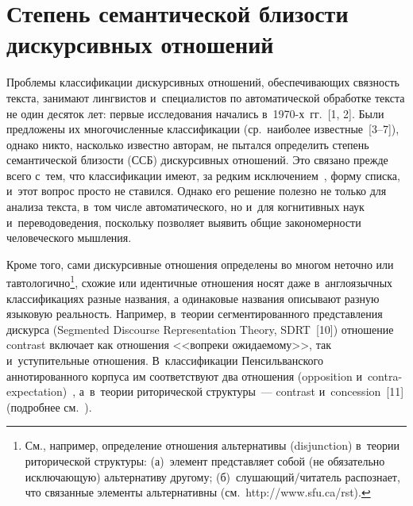 
  



\thispagestyle{headings}

\begin{multicols}{2}

\label{st\stat}
  
\section{Степень семантической близости дискурсивных 
отношений}


  Проблемы классификации дискурсивных отношений, обеспечивающих 
связность текста, занимают лингвистов и~специалистов по автоматической 
обработке текста не один десяток лет: первые исследования начались  
в~1970-х~гг.~[1, 2]. Были предложены их многочисленные классификации (ср.\ 
наиболее известные~[3--7]), однако никто, насколько известно авторам, не 
пытался определить степень семантической близости (ССБ) дискурсивных 
отношений. Это связано прежде всего с~тем, что классификации имеют, за 
редким исключением~\cite{7-in, 8-in, 9-in}, форму списка, и~этот вопрос просто 
не ставился. Однако его решение полезно не только для анализа текста, в~том 
числе автоматического, но и~для когнитивных наук и~переводоведения, 
поскольку позволяет выявить общие закономерности человеческого мышления.
  
  Кроме того, сами дискурсивные отношения определены во многом неточно 
или тавтологично\footnote[3]{См., например, определение отношения альтернативы 
(disjunction) в~теории риторической структуры: (а)~элемент пред\-став\-ля\-ет собой (не 
обязательно исключающую) альтернативу другому; (б)~слу\-ша\-ющий/чи\-та\-тель 
распознает, что связанные элементы альтернативны (см.\ {\sf http://www.sfu.ca/rst}).}, схожие 
или идентичные отношения носят даже в~англоязычных классификациях разные 
названия, а одинаковые названия описывают разную языковую реальность. 
Например, в~теории сегментированного представления дискурса (Segmented 
Discourse Representation Theory, SDRT~[10]) отношение contrast включает как 
отношения <<вопреки ожидаемому>>, так и~уступительные отношения. 
В~классификации Пенсильванского аннотированного корпуса им 
соответствуют два отношения (opposition и~contra-expectation)~\cite{7-in}, 
а~в~теории риторической структуры~--- contrast и~concession~[11] (подробнее 
см.~\cite[с.~37]{9-in}). 


\end{multicols}
